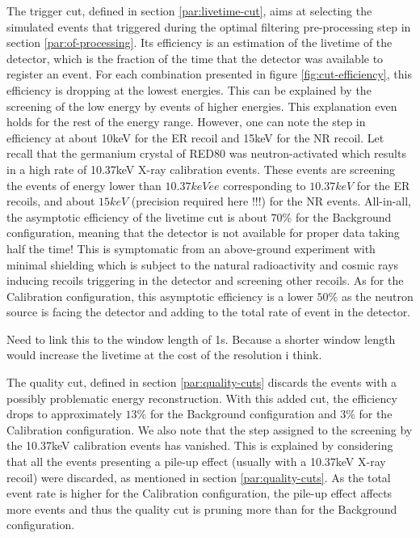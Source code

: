 The trigger cut, defined in section \ref{par:livetime-cut}, aims at selecting the simulated events that triggered during the optimal filtering pre-processing step in section \ref{par:of-processing}. Its efficiency is an estimation of the livetime of the detector, which is the fraction of the time that the detector was available to register an event. For each combination presented in figure \ref{fig:cut-efficiency}, this efficiency is dropping at the lowest energies. This can be explained by the screening of the low energy by events of higher energies. This explanation even holds for the rest of the energy range. However, one can note the step in efficiency at about 10keV for the ER recoil and 15keV for the NR recoil. Let recall that the germanium crystal of RED80 was neutron-activated which results in a high rate of 10.37keV X-ray calibration events. These events are screening the events of energy lower than $10.37keVee$ corresponding to $10.37keV$ for the ER recoils, and about $15keV$ (precision required here !!!) for the NR events. All-in-all, the asymptotic efficiency of the livetime cut is about $70\%$ for the Background configuration, meaning that the detector is not available for proper data taking half the time! This is symptomatic from an above-ground experiment with minimal shielding which is subject to the natural radioactivity and cosmic rays inducing recoils triggering in the detector and screening other recoils. As for the Calibration configuration, this asymptotic efficiency is a lower $50\%$ as the neutron source is facing the detector and adding to the total rate of event in the detector.

{\color{red} Need to link this to the window length of 1s. Because a shorter window length would increase the livetime at the cost of the resolution i think.}

The quality cut, defined in section \ref{par:quality-cuts} discards the events with a possibly problematic energy reconstruction. With this added cut, the efficiency drops to approximately $13\%$ for the Background configuration and $3\%$ for the Calibration configuration. We also note that the step assigned to the screening by the 10.37keV calibration events has vanished. This is explained by considering that all the events presenting a pile-up effect (usually with a 10.37keV X-ray recoil) were discarded, as mentioned in section \ref{par:quality-cuts}. As the total event rate is higher for the Calibration configuration, the pile-up effect affects more events and thus the quality cut is pruning more than for the Background configuration.

